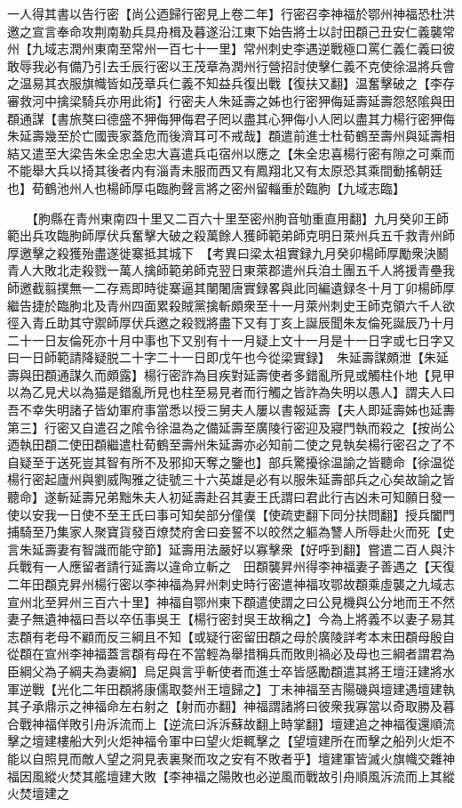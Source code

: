 一人得其書以告行密【尚公迺歸行密見上卷二年】行密召李神福於鄂州神福恐杜洪邀之宣言奉命攻荆南勒兵具舟楫及暮遂沿江東下始告將士以討田頵己丑安仁義襲常州【九域志潤州東南至常州一百七十一里】常州刺史李遇逆戰極口罵仁義仁義曰彼敢辱我必有備乃引去壬辰行密以王茂章為潤州行營招討使擊仁義不克使徐温將兵會之温易其衣服旗幟皆如茂章兵仁義不知益兵復出戰【復扶又翻】温奮擊破之【李存審救河中擒梁騎兵亦用此術】行密夫人朱延壽之姊也行密狎侮延壽延壽怨怒隂與田頵通謀【書旅獒曰德盛不狎侮狎侮君子罔以盡其心狎侮小人罔以盡其力楊行密狎侮朱延壽幾至於亡國喪家蓋危而後濟耳可不戒哉】頵遣前進士杜荀鶴至壽州與延壽相結又遣至大梁告朱全忠全忠大喜遣兵屯宿州以應之【朱全忠喜楊行密有隙之可乘而不能舉大兵以掎其後者内有淄青未服而西又有鳳翔北又有太原恐其乘間動搖朝廷也】荀鶴池州人也楊師厚屯臨朐聲言將之密州留輜重於臨朐【九域志臨】

　　【胊縣在青州東南四十里又二百六十里至密州朐音劬重直用翻】九月癸卯王師範出兵攻臨朐師厚伏兵奮擊大破之殺萬餘人獲師範弟師克明日萊州兵五千救青州師厚邀擊之殺獲殆盡遂徙寨抵其城下　【考異曰梁太祖實録九月癸卯楊師厚勵衆決鬭青人大敗北走殺戮一萬人擒師範弟師克翌日東萊郡遣州兵洎土團五千人將援青壘我師邀截翦撲無一二存焉即時徙寨逼其闉闍唐實録畧與此同編遺録冬十月丁卯楊師厚繼告捷於臨朐北及青州四面累殺賊黨擒斬頗衆至十一月萊州刺史王師克領六千人欲徑入青丘助其守禦師厚伏兵邀之殺戮將盡下又有丁亥上誕辰聞朱友倫死誕辰乃十月二十一日友倫死亦十月中事也下又别有十一月疑上文十一月是十一日字或七日字又曰一日師範請降疑脱二十字二十一日即戊午也今從梁實録】　朱延壽謀頗泄【朱延壽與田頵通謀久而頗露】楊行密詐為目疾對延壽使者多錯亂所見或觸柱仆地【見甲以為乙見犬以為猫是錯亂所見也柱至易見者而行觸之皆詐為失明以愚人】謂夫人曰吾不幸失明諸子皆幼軍府事當悉以授三舅夫人屢以書報延壽【夫人即延壽姊也延夀第三】行密又自遣召之隂令徐温為之備延壽至廣陵行密迎及寢門執而殺之【按尚公迺執田頵二使田頵繼遣杜荀鶴至壽州朱延壽亦必知前二使之見執矣楊行密召之了不自疑至于送死豈其智有所不及邪抑天奪之鑒也】部兵驚擾徐温諭之皆聽命【徐温從楊行密起廬州與劉威陶雅之徒號三十六英雄是必有以服朱延壽部兵之心矣故諭之皆聽命】遂斬延壽兄弟黜朱夫人初延壽赴召其妻王氏謂曰君此行吉凶未可知願日發一使以安我一日使不至王氏曰事可知矣部分僮僕【使疏吏翻下同分扶問翻】授兵闔門捕騎至乃集家人聚寶貨發百燎焚府舍曰妾誓不以皎然之軀為讐人所辱赴火而死【史言朱延壽妻有智識而能守節】延壽用法嚴好以寡擊衆【好呼到翻】嘗遣二百人與汴兵戰有一人應留者請行延壽以違命立斬之　田頵襲昇州得李神福妻子善遇之【天復二年田頵克昇州楊行密以李神福為昇州刺史時行密遣神福攻鄂故頵乘虛襲之九域志宣州北至昇州三百六十里】神福自鄂州東下頵遣使謂之曰公見機與公分地而王不然妻子無遺神福曰吾以卒伍事吳王【楊行密封吳王故稱之】今為上將義不以妻子易其志頵有老母不顧而反三綱且不知【或疑行密留田頵之母於廣陵詳考本末田頵母殷自從頵在宣州李神福蓋言頵有母在不當輕為舉措稱兵而敗則禍必及母也三綱者謂君為臣綱父為子綱夫為妻綱】烏足與言乎斬使者而進士卒皆感勵頵遣其將王壇汪建將水軍逆戰【光化二年田頵將康儒取婺州王壇歸之】丁未神福至吉陽磯與壇建遇壇建執其子承鼎示之神福命左右射之【射而亦翻】神福謂諸將曰彼衆我寡當以奇取勝及暮合戰神福佯敗引舟泝流而上【逆流曰泝泝蘇故翻上時掌翻】壇建追之神福復還順流擊之壇建樓船大列火炬神福令軍中曰望火炬輒擊之【望壇建所在而擊之船列火炬不能以自照見而敵人望之洞見表裏聚而攻之安有不敗者乎】壇建軍皆滅火旗幟交雜神福因風縱火焚其艦壇建大敗【李神福之陽敗也必逆風而戰故引舟順風泝流而上其縱火焚壇建之